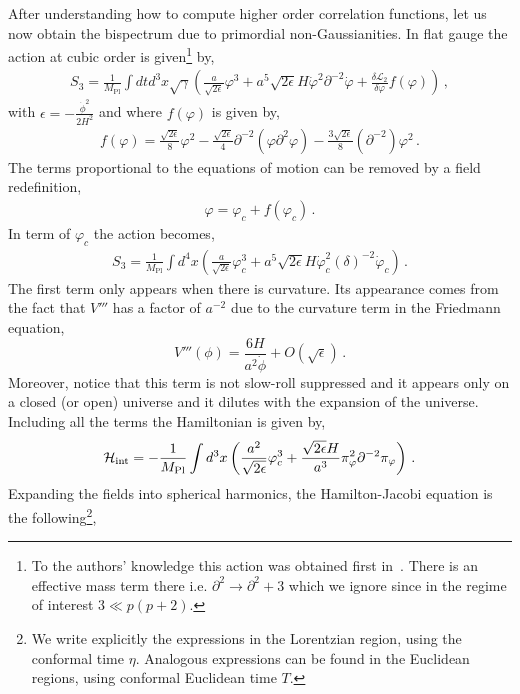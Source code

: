 \documentclass[a4paper,11pt]{article}
\numberwithin{equation}{section}
\newcommand{\mpl}{{M_{\mathrm{Pl}}}}
\numberwithin{equation}{section}
\begin{document}
After understanding how to compute higher order correlation functions, let us now obtain the bispectrum due to primordial non-Gaussianities. In flat gauge the action at cubic order is given\footnote{To the authors' knowledge this action was obtained first in~\cite{Clunan:2009ib}. There is an effective mass term there i.e. $\partial^2\rightarrow \partial^2+3$ which we ignore since in the regime of interest $3\ll p(p+2)$.} by,
\begin{align}
S_3=\frac{1}{\mpl}\int dt d^3 x \sqrt{\gamma} \left(\frac{a}{\sqrt{2\epsilon}}\varphi^3+a^5\sqrt{2\epsilon} H\dot\varphi^2 \partial^{-2}\dot\varphi +\frac{\delta \mathcal{L}_2}{\delta\varphi}f(\varphi)\right) \,,
\label{eq:cubic_action}
\end{align}
with $\epsilon = -\frac{\dot\phi^2}{2H^2}$ and where $f(\varphi)$ is  given by,
\begin{align}
f(\varphi)= \frac{\sqrt{2\epsilon}}{8}\varphi^2-\frac{\sqrt{2\epsilon}}{4}\partial^{-2}(\varphi\partial^{2}\varphi)-\frac{3\sqrt{2\epsilon}}{8}(\partial^{-2})\varphi^2 \,.
\label{eq:def_fieldrd}
\end{align}
The terms proportional to the equations of motion can be removed by a field redefinition, 
\begin{align}
\label{eq:FieldRedefinition}
\varphi=\varphi_c+f(\varphi_c) \,.
\end{align}
In term of $\varphi_c$ the action becomes,
\begin{align}
S_3=\frac{1}{\mpl}\int d^4x \left(\frac{a}{\sqrt{2\epsilon}}\varphi_c^3+a^5\sqrt{2\epsilon} H\dot\varphi_c^2(\delta)^{-2}\dot\varphi_c \right) \,.
\end{align}
The first term only appears when there is curvature. Its appearance comes from the fact that $V'''$ has a factor of $a^{-2}$ due to the curvature term in the Friedmann equation,
\begin{equation}
V'''(\phi)=\frac{6H}{a^2\dot{\phi}}+O(\sqrt{\epsilon}) \,. \nonumber
\end{equation}
Moreover, notice that this term is not slow-roll suppressed and it appears only on a closed (or open) universe and it dilutes with the expansion of the universe. 
Including all the terms the Hamiltonian is given by,
\begin{align}
\mathcal{H}_{\rm{int}}=-\frac{1}{\mpl}\int  d^3 x\left(\frac{a^2}{\sqrt{2\epsilon}}\varphi_c^3+\frac{\sqrt{2\epsilon}H}{a^3}\pi_\varphi^2\partial^{-2}\pi_\varphi\right) \,.
\label{eq:IntHamPNG}
\end{align}
Expanding the fields into spherical harmonics, the Hamilton-Jacobi equation is the following\footnote{We write explicitly the expressions in the Lorentzian region, using the conformal time $\eta$. Analogous expressions can be found in the Euclidean regions, using conformal Euclidean time $T$.},
\end{document}
